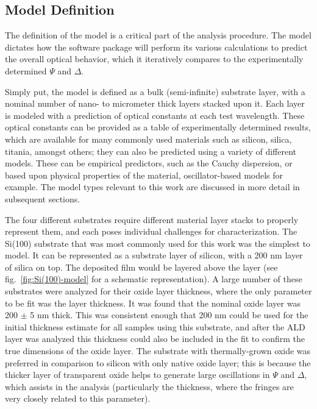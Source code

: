 
\subsection{Model Definition}

The definition of the model is a critical part of the analysis procedure. The model dictates how the software package will perform its various calculations to predict the overall optical behavior, which it iteratively compares to the experimentally determined $\Psi$ and $\Delta$. 

Simply put, the model is defined as a bulk (semi-infinite) substrate layer, with a nominal number of nano- to micrometer thick layers stacked upon it. Each layer is modeled with a prediction of optical constants at each test wavelength. These optical constants can be provided as a table of experimentally determined results, which are available for many commonly used materials such as silicon, silica, titania, amongst others; they can also be predicted using a variety of different models. These can be empirical predictors, such as the Cauchy dispersion, or based upon physical properties of the material, oscillator-based models for example. The model types relevant to this work are discussed in more detail in subsequent sections.\cite{Bruzzese_2010} 

The four different substrates require different material layer stacks to properly represent them, and each poses individual challenges for characterization. The Si(100) substrate that was most commonly used for this work was the simplest to model. It can be represented as a substrate layer of silicon, with a 200 nm layer of silica on top. The deposited film would be layered above the  layer (see fig.~\vref{fig:Si(100)-model} for a schematic representation). A large number of these substrates were analyzed for their oxide layer thickness, where the only parameter to be fit was the layer thickness. It was found that the nominal oxide layer was 200 $\pm$ 5 nm thick. This was consistent enough that 200 nm could be used for the initial thickness estimate for all samples using this substrate, and after the ALD layer was analyzed this thickness could also be included in the fit to confirm the true dimensions of the oxide layer. The substrate with thermally-grown oxide was preferred in comparison to silicon with only native oxide layer; this is because the thicker layer of transparent oxide helps to generate large oscillations in $\Psi$ and $\Delta$, which assists in the analysis (particularly the thickness, where the fringes are very closely related to this parameter).\cite{Bruzzese_2010} 

